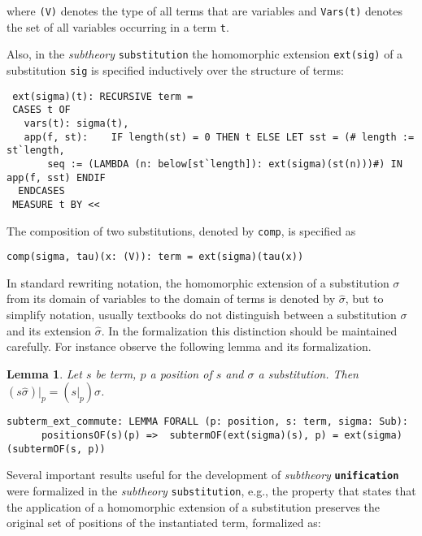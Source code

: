 \documentclass[submission,copyright,creativecommons]{eptcs}
\newtheorem{lemma}[theorem]{Lemma}
\begin{document}
\noindent where {\tt (V)} denotes the type of all terms that are
variables and {\tt Vars(t)} denotes the set of all variables occurring
in a term {\tt t}.

Also, in the \emph{subtheory} {\tt substitution} the homomorphic
extension {\tt ext(sig)} of a substitution {\tt sig} is specified
inductively over the structure of terms:

{\small
\begin{verbatim}
 ext(sigma)(t): RECURSIVE term =   
 CASES t OF 
   vars(t): sigma(t),
   app(f, st):    IF length(st) = 0 THEN t ELSE LET sst = (# length := st`length,
       seq := (LAMBDA (n: below[st`length]): ext(sigma)(st(n)))#) IN app(f, sst) ENDIF
  ENDCASES
 MEASURE t BY <<
\end{verbatim}
}

The composition of two substitutions, denoted by {\tt comp}, is
specified as

{\small
\begin{verbatim}
comp(sigma, tau)(x: (V)): term = ext(sigma)(tau(x))
\end{verbatim}
}

In standard rewriting notation, the homomorphic extension of a
substitution $\sigma$ from its domain of variables to the domain of
terms is denoted by $\hat{\sigma}$, but to simplify notation, usually
textbooks do not distinguish between a substitution $\sigma$ and its
extension $\hat{\sigma}$.  In the formalization this distinction
should be maintained carefully.  For instance observe the following
lemma and its formalization.
 
\begin{lemma}
  Let $s$ be term, $p$ a position of $s$ and $\sigma$ a
  substitution. Then $(s\hat{\sigma})|_{p} = (s|_{p})\hat{\sigma}$.
\end{lemma}

{\small
\begin{verbatim}
subterm_ext_commute: LEMMA FORALL (p: position, s: term, sigma: Sub):
      positionsOF(s)(p) =>  subtermOF(ext(sigma)(s), p) = ext(sigma)(subtermOF(s, p))
\end{verbatim}
}

Several important results useful for the development of
\emph{subtheory} {\tt \bf unification} were formalized in the
\emph{subtheory} {\tt substitution}, e.g., the property that states
that the application of a homomorphic extension of a substitution
preserves the original set of positions of the instantiated term,
formalized as:
\end{document}

